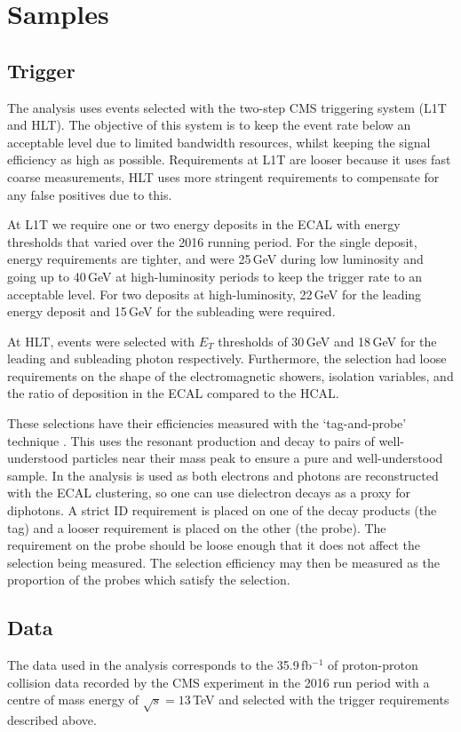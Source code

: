 \section{Samples}

\subsection{Trigger}
The analysis uses events selected with the two-step CMS triggering system (L1T and HLT). The objective of this system is to keep the event rate below an acceptable level due to limited bandwidth resources, whilst keeping the signal efficiency as high as possible. Requirements at L1T are looser because it uses fast coarse measurements, HLT uses more stringent requirements to compensate for any false positives due to this.

At L1T we require one or two energy deposits in the ECAL with energy thresholds that varied over the 2016 running period. For the single deposit, energy requirements are tighter, and were 25\,GeV during low luminosity and going up to 40\,GeV at high-luminosity periods to keep the trigger rate to an acceptable level. For two deposits at high-luminosity, 22\,GeV for the leading energy deposit and 15\,GeV for the subleading were required. 

At HLT, events were selected with $E_{T}$ thresholds of 30\,GeV and 18\,GeV for the leading and subleading photon respectively. 
Furthermore, the selection had loose requirements on the shape of the electromagnetic showers, isolation variables, and the ratio of deposition in the ECAL compared to the HCAL. 

These selections have their efficiencies measured with the `tag-and-probe' technique \cite{TagAndProbe}. 
This uses the resonant production and decay to pairs of well-understood particles near their mass peak to ensure a pure and well-understood sample. 
In the \Hgg analysis \Zee is used as both electrons and photons are reconstructed with the ECAL clustering, so one can use dielectron decays as a proxy for diphotons. 
A strict ID requirement is placed on one of the decay products (the tag) and a looser requirement is placed on the other (the probe). 
The requirement on the probe should be loose enough that it does not affect the selection being measured. The selection efficiency may then be measured as the proportion of the probes which satisfy the selection.


\subsection{Data}
The data used in the analysis corresponds to the 35.9\,fb$^{-1}$ of proton-proton collision data recorded by the CMS experiment in the 2016 run period with a centre of mass energy of $\sqrt{s}=13$\,TeV and selected with the trigger requirements described above. 




